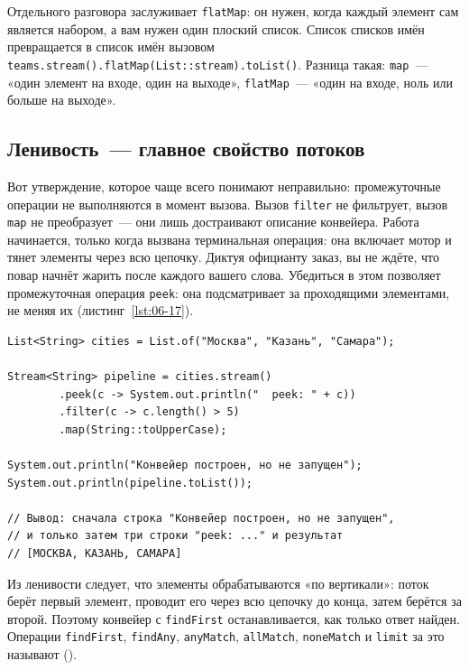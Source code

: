Отдельного разговора заслуживает \texttt{flatMap}: он нужен, когда каждый
элемент сам является набором, а вам нужен один плоский список. Список списков
имён превращается в список имён вызовом
\texttt{teams.stream().flatMap(List::stream).toList()}. Разница такая:
\texttt{map}~--- «один элемент на входе, один на выходе»,
\texttt{flatMap}~--- «один на входе, ноль или больше на выходе».

\subsection{Ленивость~--- главное свойство потоков}

Вот утверждение, которое чаще всего понимают неправильно: промежуточные
операции не выполняются в момент вызова. Вызов \texttt{filter} не фильтрует,
вызов \texttt{map} не преобразует~--- они лишь достраивают описание конвейера.
Работа начинается, только когда вызвана терминальная операция: она включает
мотор и тянет элементы через всю цепочку. Диктуя официанту заказ, вы не ждёте,
что повар начнёт жарить после каждого вашего слова. Убедиться в этом позволяет
промежуточная операция \texttt{peek}: она подсматривает за проходящими
элементами, не меняя их (листинг~\ref{lst:06-17}).

\begin{listing}[H]
\begin{verbatim}
List<String> cities = List.of("Москва", "Казань", "Самара");

Stream<String> pipeline = cities.stream()
        .peek(c -> System.out.println("  peek: " + c))
        .filter(c -> c.length() > 5)
        .map(String::toUpperCase);

System.out.println("Конвейер построен, но не запущен");
System.out.println(pipeline.toList());

// Вывод: сначала строка "Конвейер построен, но не запущен",
// и только затем три строки "peek: ..." и результат
// [МОСКВА, КАЗАНЬ, САМАРА]
\end{verbatim}
\caption{Ленивость конвейера, показанная через peek}
\label{lst:06-17}
\end{listing}

Из ленивости следует, что элементы обрабатываются «по вертикали»: поток берёт
первый элемент, проводит его через всю цепочку до конца, затем берётся за
второй. Поэтому конвейер с \texttt{findFirst} останавливается, как только
ответ найден. Операции \texttt{findFirst}, \texttt{findAny},
\texttt{anyMatch}, \texttt{allMatch}, \texttt{noneMatch} и \texttt{limit} за
это называют  ().

